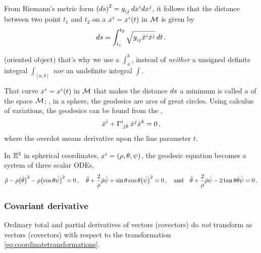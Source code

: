 From Riemann's metric form $\sqlinelem = \tcovmet ij\,d\tvec\pos i d\tvec\pos j$, it follows that the distance between two point $t_1$ and $t_2$ on a  $\tvec\pos i = \tvec\pos i\vat t$ in $\manifold M$ is given by
%
\begin{equation*}
  \linelem = \int_{t_1}^{t_2}\sqrt{\tcovmet ij\tvec{\dt\pos}{i}\tvec{\dt\pos}{j}}\,dt\,.
\end{equation*}

\begin{note}
   (oriented object) that's why we use a  $\int_a^b$, instead of \emph{neither} a unsigned definite integral $\int_{[a,b]}$ \emph{nor} an undefinite integral $\int$.
\end{note}

That curve $\tvec\pos i = \tvec\pos i\vat t$ in $\manifold M$ that makes the distance $ds$ a minimum is called a  of the space $\manifold M$; \eg, in a sphere, the geodesics are arcs of great circles. Using calculus of variations, the geodesics can be found from the ,
%
\begin{equation}\label{eq:geodesicequation}
    \tvec{\ddt\pos}{i} + \skchris ijk\,\tvec{\dt\pos}j\tvec{\dt\pos}k = 0\,,
\end{equation}
%
where the overdot means derivative upon the line parameter $t$.

\begin{example}
  In $\mathbb{E}^{3}$ in spherical coordinates, $\tvec\pos i = \tuple{\sxpos,\sypos,\szpos}$, the geodesic equation becomes a system of three scalar ODEs,
  \begin{equation}
    \ddt\sxpos - \sxpos\parens{\dt\sypos}^2 - \sxpos\parens{\cos\sypos\dt\szpos}^2 = 0\,,\quad
    \ddt\sypos + \dfrac{2}{\sxpos}\dt\sxpos\dt\szpos + \sin\sypos\cos\sypos\parens{\dt\szpos}^2 = 0\,,\quad\text{and}\quad
    \ddt\sypos + \dfrac{2}{\sxpos}\dt\sxpos\dt\szpos - 2\tan\sypos\dt\sypos\dt\szpos = 0\,.
  \end{equation}
\end{example}


\subsubsection{Covariant derivative}
%
Ordinary total and partial derivatives of vectors (covectors) do \emph{not} transform as vectors (covectors) with respect to the transformation \cref{eq:coordinatetransformations}.

